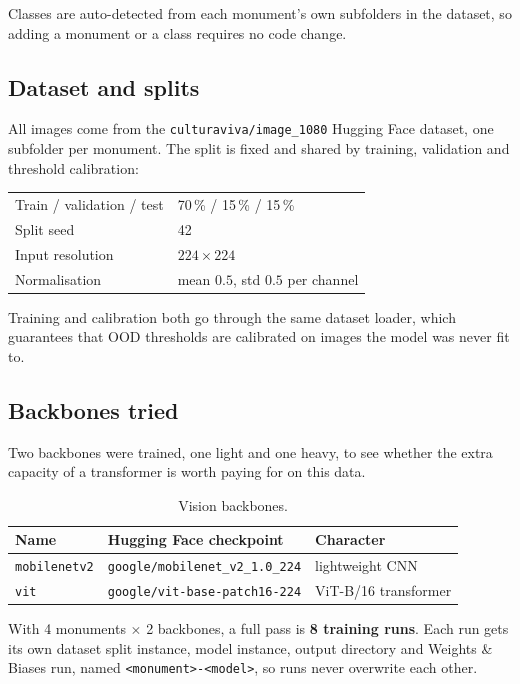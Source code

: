 \documentclass[11pt,a4paper]{article}
\begin{document}
Classes are auto-detected from each monument's own subfolders in the dataset,
so adding a monument or a class requires no code change.

\subsection{Dataset and splits}

All images come from the \texttt{culturaviva/image\_1080} Hugging Face dataset,
one subfolder per monument. The split is fixed and shared by training,
validation and threshold calibration:

\begin{center}
\begin{tabular}{ll}
\toprule
Train / validation / test & 70\,\% / 15\,\% / 15\,\% \\
Split seed & 42 \\
Input resolution & $224 \times 224$ \\
Normalisation & mean $0.5$, std $0.5$ per channel \\
\bottomrule
\end{tabular}
\end{center}

Training and calibration both go through the same dataset loader, which
guarantees that OOD thresholds are calibrated on images the model was never fit
to.

\subsection{Backbones tried}

Two backbones were trained, one light and one heavy, to see whether the extra
capacity of a transformer is worth paying for on this data.

\begin{table}[h]
\centering
\caption{Vision backbones.}
\label{tab:vision-backbones}
\begin{tabular}{lll}
\toprule
\textbf{Name} & \textbf{Hugging Face checkpoint} & \textbf{Character} \\
\midrule
\texttt{mobilenetv2} & \texttt{google/mobilenet\_v2\_1.0\_224} & lightweight CNN \\
\texttt{vit}         & \texttt{google/vit-base-patch16-224}    & ViT-B/16 transformer \\
\bottomrule
\end{tabular}
\end{table}

With 4 monuments $\times$ 2 backbones, a full pass is \textbf{8 training runs}.
Each run gets its own dataset split instance, model instance, output directory
and Weights \& Biases run, named \texttt{<monument>-<model>}, so runs never
overwrite each other.
\end{document}

